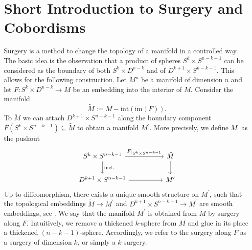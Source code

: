 \cleardoublepage
\hypertarget{appendixdivider}{}
\begingroup
  \let\OriginalChapterHeadStartVSkip\chapterheadstartvskip
  \renewcommand*{\chapterheadstartvskip}{%
    \OriginalChapterHeadStartVSkip
    \raggedright\usekomafont{chapter}\sffamily\bfseries\appendixname\par
    \vspace{0.5em}%
  }
  \chapter{Short Introduction to Surgery and Cobordisms}
  \label{chapter:appendix_a}
\endgroup
\vspace{-1.9em}

\noindent Surgery is a method to change the topology of a manifold in a controlled way. The basic idea is the observation that a product of spheres $S^k \times S^{n-k-1}$ can be considered as the boundary of both $S^k \times D^{n-k}$ and of $D^{k+1} \times S^{n-k-1}$. This allows for the following construction. Let $M^n$ be a manifold of dimension $n$ and let $F \colon S^k \times D^{n-k} \to M$ be an embedding into the interior of $M$. Consider the manifold
\[
\tilde{M} := M - \mathrm{int}(\mathrm{im}(F)).
\]
To $\tilde{M}$ we can attach $D^{k+1} \times S^{n-k-1}$ along the boundary component $F(S^k \times S^{n-k-1}) \subseteq \tilde{M}$ to obtain a manifold $M^\prime$. More precisely, we define $M^\prime$ as the pushout 
\[\begin{tikzcd}[column sep = 1.75cm]
	{S^k \times S^{n-k-1}} & {\tilde{M}} \\
	{D^{k+1} \times S^{n-k-1}} & {M^\prime}
	\arrow["{F|_{S^k \times S^{n-k-1}}}", from=1-1, to=1-2]
	\arrow["{\mathrm{incl.}}", from=1-1, to=2-1]
	\arrow[from=1-2, to=2-2]
	\arrow[from=2-1, to=2-2]
\end{tikzcd}\]
Up to diffeomorphism, there exists a unique smooth structure on $M^\prime$, such that the topological embeddings $\tilde{M} \to M^\prime$ and $D^{k+1} \times S^{n-k-1} \to M^\prime$ are smooth embeddings, see \cite[Thm. 1.4]{Milnor1965}. We say that the manifold $M^\prime$ is obtained from $M$ by surgery along $F$. Intuitively, we remove a thickened $k$-sphere from $M$ and glue in its place a thickened $(n-k-1)$-sphere. Accordingly, we refer to the surgery along $F$ as a surgery of dimension $k$, or simply a $k$-surgery. 

